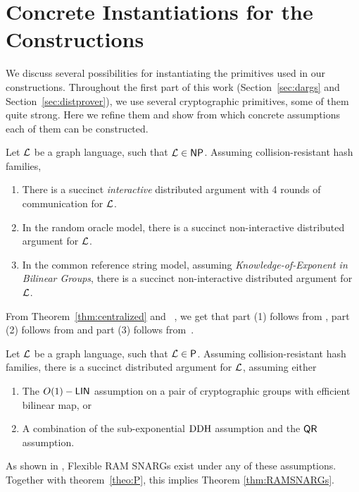 \section{Concrete Instantiations for the Constructions }\label{app:concrete}
We discuss several possibilities for instantiating the primitives used in our constructions. Throughout the first part of this work (Section~\ref{sec:dargs} and Section~\ref{sec:distprover}), we use several cryptographic primitives, some of them quite strong. Here we refine them and show from which concrete assumptions each of them can be constructed.

\begin{theorem}\label{thm:concDargs}
    Let $\mathcal{L}$ be a graph language, such that $\mathcal{L}\in {\mathsf{NP}}$. Assuming collision-resistant hash families,
    \begin{enumerate}
        \item There is a succinct \emph{interactive} distributed argument with 4 rounds of communication for $\mathcal{L}$. 
        \item In the random oracle model, there is a succinct non-interactive distributed argument for $\mathcal{L}$.
        \item In the common reference string model, assuming \emph{Knowledge-of-Exponent in Bilinear Groups}, there is a succinct non-interactive distributed argument for $\mathcal{L}$. 
    \end{enumerate}
\end{theorem}
From Theorem~\ref{thm:centralized} and ~\cite{merkle1989certified}, we get that part (1) follows from \cite{kilian1992note}, part (2) follows from \cite{micali2000computationally} and part (3) follows from~\cite{bitansky2013SNARKsLIPs}.

\begin{theorem}\label{thm:RAMSNARGs}
    Let $\mathcal{L}$ be a graph language, such that $\mathcal{L}\in {\mathsf{P}}$. Assuming collision-resistant hash families, there is a succinct distributed argument for $\mathcal{L}$, assuming either
    \begin{enumerate}
        \item The $O(1)-\mathsf{LIN}$ assumption on a pair of cryptographic groups with efficient bilinear map, or
        \item A combination of the sub-exponential $\mathrm{DDH}$ assumption and the $\mathsf{QR}$ assumption.
    \end{enumerate}
\end{theorem}
As shown in  \cite{cryptoeprint:2022/1320}, Flexible RAM SNARGs exist under any of these assumptions. Together with theorem~\ref{theo:P}, this implies Theorem \ref{thm:RAMSNARGs}.

